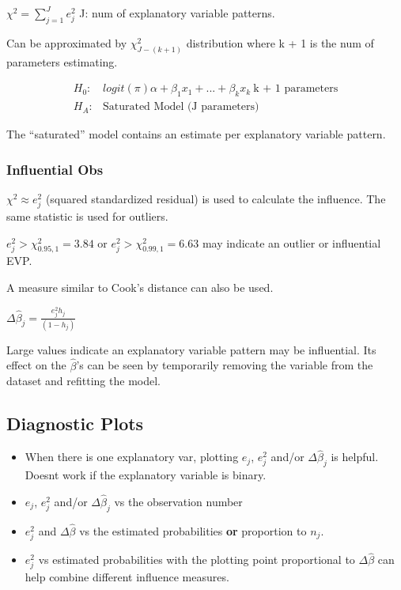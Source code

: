 \documentclass[11pt]{article}
\begin{document}
\(\chi^2 = \sum_{j = 1}^{J} e_j^2\)
J: num of explanatory variable patterns.

Can be approximated by \(\chi_{J - (k + 1)}^2\) distribution where k + 1 is the
num of parameters estimating.

\begin{equation}
\begin{split}
H_0: & logit(\pi) \alpha + \beta_1 x_1 + ... + \beta_k x_k \ \text{k + 1 parameters}\\
H_A: & \text{Saturated Model (J parameters)}
\end{split}
\end{equation}

The ``saturated'' model contains an estimate per explanatory variable pattern.

\subsubsection{Influential Obs}
\label{sec:orgab713aa}

\(\chi^2 \approx e_j^2\) (squared standardized residual) is used to calculate the
influence. The same statistic is used for outliers.

\(e_j^2 > \chi_{0.95,1}^2 = 3.84\) or \(e_j^2 > \chi_{0.99,1}^2 = 6.63\) may
indicate an outlier or influential EVP.

A measure similar to Cook's distance can also be used.

\(\Delta \hat \beta_j = \frac{e_j^2 h_j}{(1 - h_j)}\)

Large values indicate an explanatory variable pattern may be influential. Its
effect on the \(\hat \beta\)'s can be seen by temporarily removing the variable
from the dataset and refitting the model.

\subsection{Diagnostic Plots}
\label{sec:orgf7377ea}
\begin{itemize}
\item When there is one explanatory var, plotting \(e_j\), \(e_j^2\) and/or \(\Delta \hat
  \beta_j\) is helpful. Doesnt work if the explanatory variable is binary.
\item \(e_j\), \(e_j^2\) and/or \(\Delta \hat \beta_j\) vs the observation number
\item \(e_j^2\) and \(\Delta \hat \beta\) vs the estimated probabilities \textbf{or} proportion
to \(n_j\).
\item \(e_j^2\) vs estimated probabilities with the plotting point proportional to
\(\Delta \hat \beta\) can help combine different influence measures.
\end{itemize}
\end{document}
